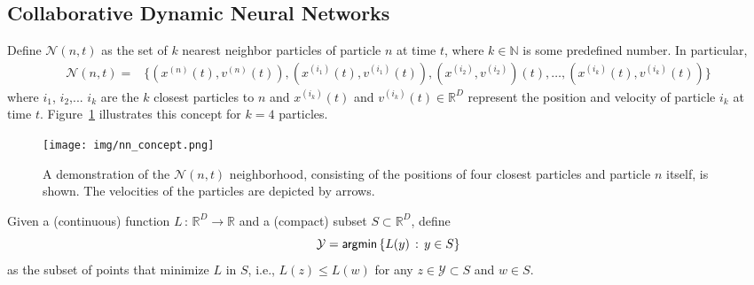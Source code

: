 \documentclass[fleqn,10pt]{wlscirep}
\begin{document}
\subsection{Collaborative Dynamic Neural Networks}
\label{sec:collab}
Define $\mathcal{N}(n,t)$ as the set of $k$ nearest neighbor particles of particle $n$ at time $t$, where $k\in\mathbb{N}$ is some predefined number. In particular, 
\begin{equation}
\begin{aligned}
\mathcal{N}(n,t) ={} & \{(x^{(n)}(t),v^{(n)}(t)),
      (x^{(i_1)}(t),v^{(i_1)}(t)),(x^{(i_2)},v^{(i_2)})(t),\ldots,
      (x^{(i_k)}(t),v^{(i_k)}(t))\}
\end{aligned}
\end{equation}
where $i_1$, $i_2$,... $i_k$ are the $k$ closest particles to $n$ and $x^{(i_k)}(t)$ and $v^{(i_k)}(t)\in \mathbb{R}^D$ represent the position and velocity of particle $i_k$ at time $t$. Figure~\ref{fig:nn_concept} illustrates this concept for $k=4$ particles.
\begin{figure} [hbt]
\begin{center}
\texttt{[image: img/nn\_concept.png]}
\caption{A demonstration of the $\mathcal{N}(n,t)$ neighborhood, consisting of the positions of four closest particles and particle $n$ itself, is shown. The velocities of the particles are depicted by arrows.}
\label{fig:nn_concept}
\end{center}
\end{figure}


Given a (continuous) function $L\,:\,\mathbb{R}^D\longrightarrow \mathbb{R}$ and a (compact) subset $S\subset \mathbb{R}^D$, define
\begin{equation}
\mathcal{Y}={\sf argmin}\left\{L(y)\,:\,y\in S\right\}
\end{equation}
as the subset of points that minimize $L$ in $S$, i.e., $L(z)\leq L(w)$ for any $z\in \mathcal{Y}\subset S$ and $w\in S$.
\end{document}
